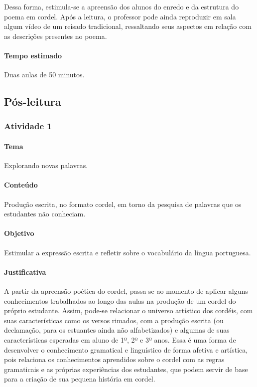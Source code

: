 \documentclass[11pt]{extarticle}
\begin{document}
Dessa forma, estimula-se a apreensão dos alunos do enredo e da estrutura do poema em cordel.
Após a leitura, o professor pode ainda reproduzir em sala algum vídeo de um reisado tradicional, ressaltando seus aspectos em relação com as descrições presentes no poema.

\paragraph{Tempo estimado} Duas aulas de 50 minutos.


\subsection{Pós-leitura}

\subsubsection{Atividade 1}


\paragraph{Tema} Explorando novas palavras.

\paragraph{Conteúdo} Produção escrita, no formato cordel, em torno da pesquisa de palavras que os estudantes não conheciam.

\paragraph{Objetivo} Estimular a expressão escrita e refletir sobre o vocabulário da língua portuguesa.

\paragraph{Justificativa} A partir da apreensão poética do cordel, passa-se ao momento de aplicar alguns conhecimentos trabalhados ao longo das aulas na produção de um cordel do próprio estudante. Assim, pode-se relacionar o universo artístico dos cordéis, com suas características como os versos rimados, com a produção escrita (ou declamação, para os estuantes ainda não alfabetizados) e algumas de suas características esperadas em aluno de 1º, 2º e 3º anos. Essa é uma forma de desenvolver o conhecimento gramatical e linguístico de forma afetiva e artística, pois relaciona os conhecimentos aprendidos sobre o cordel com as regras gramaticais e as próprias experiências dos estudantes, que podem servir de base para a criação de sua pequena história em cordel.
\end{document}
